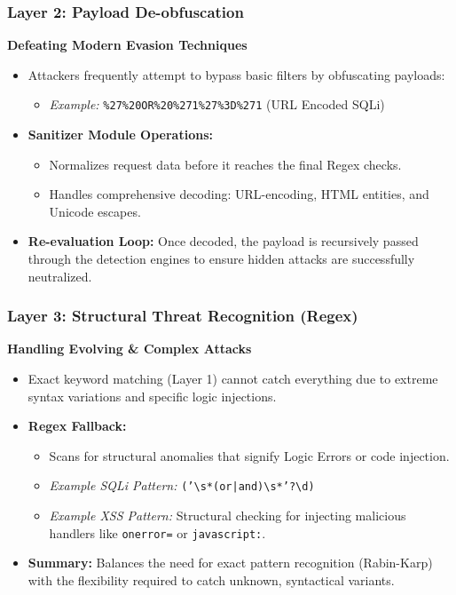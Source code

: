 \documentclass{beamer}
\begin{document}
\begin{frame}
\frametitle{Layer 2: Payload De-obfuscation}
\textbf{Defeating Modern Evasion Techniques}
\begin{itemize}
    \item Attackers frequently attempt to bypass basic filters by obfuscating payloads:
    \begin{itemize}
        \item \textit{Example:} \texttt{\%27\%20OR\%20\%271\%27\%3D\%271} (URL Encoded SQLi)
    \end{itemize}
    \vspace{0.2cm}
    \item \textbf{Sanitizer Module Operations:}
    \begin{itemize}
        \item Normalizes request data before it reaches the final Regex checks.
        \item Handles comprehensive decoding: URL-encoding, HTML entities, and Unicode escapes.
    \end{itemize}
    \item \textbf{Re-evaluation Loop:} Once decoded, the payload is recursively passed through the detection engines to ensure hidden attacks are successfully neutralized.
\end{itemize}
\end{frame}

\begin{frame}
\frametitle{Layer 3: Structural Threat Recognition (Regex)}
\textbf{Handling Evolving \& Complex Attacks}
\begin{itemize}
    \item Exact keyword matching (Layer 1) cannot catch everything due to extreme syntax variations and specific logic injections.
    \item \textbf{Regex Fallback:}
    \begin{itemize}
        \item Scans for structural anomalies that signify Logic Errors or code injection.
        \item \textit{Example SQLi Pattern:} \texttt{('\textbackslash s*(or|and)\textbackslash s*'?\textbackslash d)}
        \item \textit{Example XSS Pattern:} Structural checking for injecting malicious handlers like \texttt{onerror=} or \texttt{javascript:}.
    \end{itemize}
    \item \textbf{Summary:} Balances the need for exact pattern recognition (Rabin-Karp) with the flexibility required to catch unknown, syntactical variants.
\end{itemize}
\end{frame}
\end{document}

